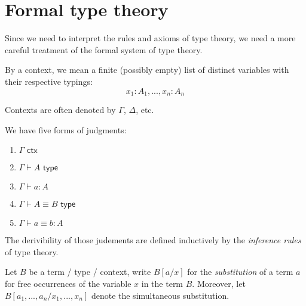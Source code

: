 \section{Formal type theory}

Since we need to interpret the rules and axioms of type theory, we need a more careful treatment of the formal system of type theory.

By a context, we mean a finite (possibly empty) list of distinct variables with their respective typings:
\[x_1:A_1,...,x_n:A_n\]

Contexts are often denoted by $\Gamma$, $\Delta$, etc.

We have five forms of judgments:
\begin{enumerate}
    \item $\Gamma \textsf{ ctx}$
    \item $\Gamma \vdash A \textsf{ type}$
    \item $\Gamma \vdash a : A$
    \item $\Gamma \vdash A \equiv B  \textsf{ type}$
    \item $\Gamma \vdash a \equiv b : A$
\end{enumerate}

The derivibility of those judements are defined inductively by the \textit{inference rules} of type theory.

Let $B$ be a term / type / context, write $B[a/x]$ for the \textit{substitution} of a term $a$ for free occurrences of the variable $x$ in the term $B$. Moreover, let $B[a_1,...,a_n/x_1,...,x_n]$ denote the simultaneous substitution.

